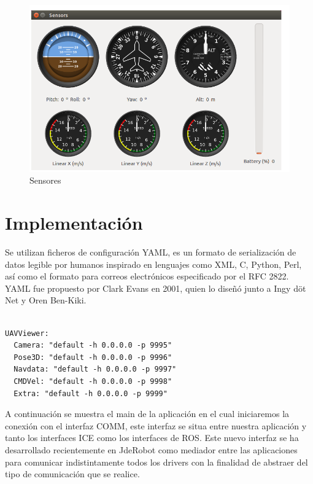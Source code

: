 \begin{figure}[H]
  \centering
  \includegraphics[scale=0.4]{imagenes/sensores.png}
  \caption{Sensores}
  \label{fig:sensores}
\end{figure}

\section{Implementación}

Se utilizan ficheros de configuración YAML, es un formato de serialización de datos legible por humanos inspirado en lenguajes como XML, C, Python, Perl, así como el formato para correos electrónicos especificado por el RFC 2822. YAML fue propuesto por Clark Evans en 2001, quien lo diseñó junto a Ingy döt Net y Oren Ben-Kiki.


{\scriptsize
\begin{verbatim}

UAVViewer:
  Camera: "default -h 0.0.0.0 -p 9995"
  Pose3D: "default -h 0.0.0.0 -p 9996"
  Navdata: "default -h 0.0.0.0 -p 9997"
  CMDVel: "default -h 0.0.0.0 -p 9998"
  Extra: "default -h 0.0.0.0 -p 9999"
\end{verbatim}}

A continuación se muestra el main de la aplicación en el cual iniciaremos la conexión con el interfaz COMM, este interfaz se situa entre nuestra aplicación y tanto los interfaces ICE como los interfaces de ROS. Este nuevo interfaz se ha desarrollado recientemente en JdeRobot como mediador entre las aplicaciones para comunicar indistintamente todos los drivers con la finalidad de abstraer del tipo de comunicación que se realice.

